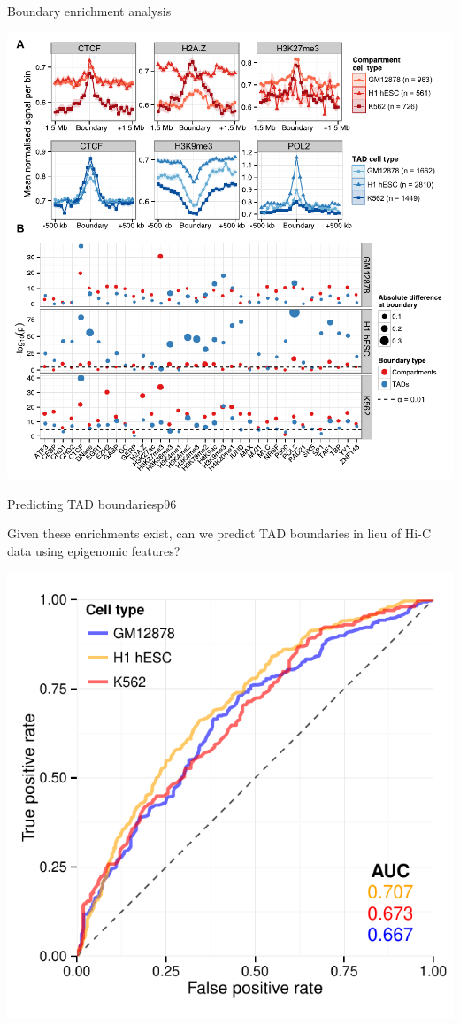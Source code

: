\documentclass{beamer}
\begin{document}
\begin{frame}{Boundary enrichment analysis}

\centering

\includegraphics[width=.8\textwidth]{../figs/boundarysummary.pdf}

\end{frame}

\begin{frame}{Predicting TAD boundaries}{p96}

Given these enrichments exist, can we predict TAD boundaries in lieu of Hi-C data using epigenomic features? \\

\vspace{2em}

\centering
\includegraphics[width=.5\textwidth]{../figs/tadpred_auroc.pdf}


\end{frame}
\end{document}
